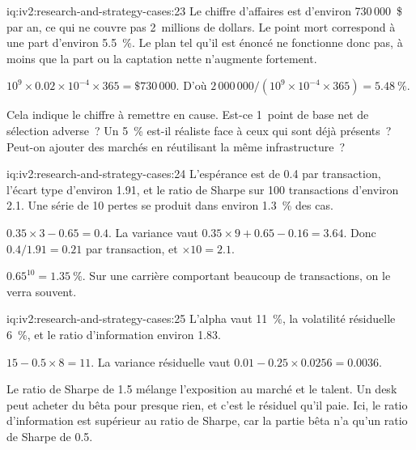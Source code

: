 \begin{solution}{iq:iv2:research-and-strategy-cases:23}
Le chiffre d'affaires est d'environ 730\,000~\$ par an, ce qui ne couvre pas 2~millions de dollars. Le point mort correspond à une part d'environ 5.5~\%. Le plan tel qu'il est énoncé ne fonctionne donc pas, à moins que la part ou la captation nette n'augmente fortement.

$10^9 \times 0.02 \times 10^{-4} \times 365 = \$730\,000$. D'où $2\,000\,000/(10^9 \times 10^{-4} \times 365) = 5.48~\%$.

Cela indique le chiffre à remettre en cause. Est-ce 1~point de base net de sélection adverse~? Un 5~\% est-il réaliste face à ceux qui sont déjà présents~? Peut-on ajouter des marchés en réutilisant la même infrastructure~?

\end{solution}

\begin{solution}{iq:iv2:research-and-strategy-cases:24}
L'espérance est de 0.4 par transaction, l'écart type d'environ 1.91, et le ratio de Sharpe sur 100 transactions d'environ 2.1. Une série de 10 pertes se produit dans environ 1.3~\% des cas.

$0.35 \times 3 - 0.65 = 0.4$. La variance vaut $0.35 \times 9 + 0.65 - 0.16 = 3.64$. Donc $0.4/1.91 = 0.21$ par transaction, et $\times 10 = 2.1$.

$0.65^{10} = 1.35~\%$. Sur une carrière comportant beaucoup de transactions, on le verra souvent.

\end{solution}

\begin{solution}{iq:iv2:research-and-strategy-cases:25}
L'alpha vaut 11~\%, la volatilité résiduelle 6~\%, et le ratio d'information environ 1.83.

$15 - 0.5 \times 8 = 11$. La variance résiduelle vaut $0.01 - 0.25 \times 0.0256 = 0.0036$.

Le ratio de Sharpe de 1.5 mélange l'exposition au marché et le talent. Un desk peut acheter du bêta pour presque rien, et c'est le résiduel qu'il paie. Ici, le ratio d'information est supérieur au ratio de Sharpe, car la partie bêta n'a qu'un ratio de Sharpe de 0.5.

\end{solution}

